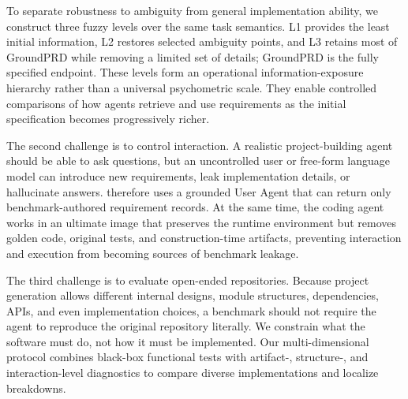 To separate robustness to ambiguity from general implementation ability, we construct three fuzzy levels over the same task semantics. L1 provides the least initial information, L2 restores selected ambiguity points, and L3 retains most of GroundPRD while removing a limited set of details; GroundPRD is the fully specified endpoint. These levels form an operational information-exposure hierarchy rather than a universal psychometric scale. They enable controlled comparisons of how agents retrieve and use requirements as the initial specification becomes progressively richer.

The second challenge is to control interaction. A realistic project-building agent should be able to ask questions, but an uncontrolled user or free-form language model can introduce new requirements, leak implementation details, or hallucinate answers. \rcb{} therefore uses a grounded User Agent that can return only benchmark-authored requirement records. At the same time, the coding agent works in an ultimate image that preserves the runtime environment but removes golden code, original tests, and construction-time artifacts, preventing interaction and execution from becoming sources of benchmark leakage.

The third challenge is to evaluate open-ended repositories. Because project generation allows different internal designs, module structures, dependencies, APIs, and even implementation choices, a benchmark should not require the agent to reproduce the original repository literally. We constrain what the software must do, not how it must be implemented. Our multi-dimensional protocol combines black-box functional tests with artifact-, structure-, and interaction-level diagnostics to compare diverse implementations and localize breakdowns.


